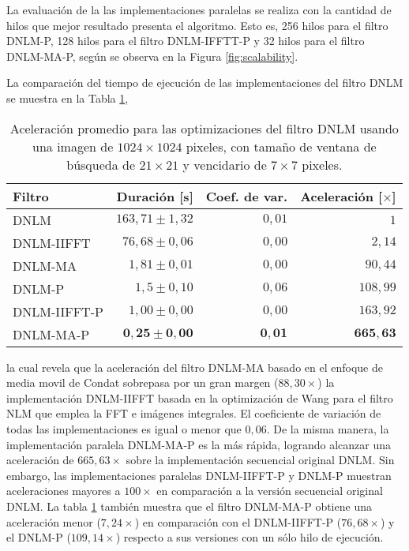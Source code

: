 La evaluaci\'on de la las implementaciones paralelas se realiza con la cantidad de hilos que mejor resultado presenta el algoritmo. Esto es, 256 hilos para el filtro DNLM-P, 128 hilos para el filtro DNLM-IFFTT-P y 32 hilos para el filtro DNLM-MA-P, según se observa en la Figura \ref{fig:scalability}. 


La comparación del tiempo de ejecución de las implementaciones del filtro DNLM se muestra en la Tabla \ref{tabla:speedup},
%
\begin{table}[htb]
\protect\caption[Aceleración promedio de optimizaciones del filtro DNLM]{Aceleración promedio para las optimizaciones del filtro DNLM usando una imagen de  $1024 \times 1024$ pixeles, con tama\~no de ventana de búsqueda de $21 \times 21$ y vencidario de $7 \times 7$ pixeles. \label{tabla:speedup}}
\centering
\begin{tabular}{lrrr}
Filtro & Duración [s]& Coef. de var. & Aceleración [$\times$]\tabularnewline
\hline
DNLM & $163,71\pm1,32$ & $0,01$ & $1$\tabularnewline
DNLM-IIFFT & $76,68\pm0,06$ & $0,00$ & $2,14$\tabularnewline
DNLM-MA & $1,81\pm 0,01$ & $0,00$ & $90,44$ \tabularnewline
DNLM-P & $1,5\pm0,10$ & $0,06$ & $108,99$\tabularnewline
DNLM-IIFFT-P & $1,00\pm0,00$ & $0,00$ & $163,92$ \tabularnewline 
DNLM-MA-P & $\boldsymbol{0,25\pm0,00}$ & $\boldsymbol{0,01}$ &  $\boldsymbol{665,63}$\tabularnewline
\end{tabular}
\end{table}
%
la cual revela que la aceleración del filtro DNLM-MA basado en el enfoque de media movil de Condat \cite{Condat2010} sobrepasa por un gran margen ($88,30\times$) la implementación DNLM-IIFFT \cite{CalderonRamirez2017} basada en la optimización de Wang para el filtro NLM \cite{wang2006fast} que emplea la FFT e imágenes integrales. El coeficiente de variación de todas las implementaciones es igual o menor que $0,06$. 
De la misma manera, la implementación paralela DNLM-MA-P es la más rápida, logrando alcanzar una aceleración de $665,63\times$ sobre la implementación secuencial original DNLM. Sin embargo, las implementaciones paralelas DNLM-IIFFT-P y DNLM-P muestran aceleraciones mayores a $100\times$ en comparación a la versión secuencial original DNLM.
La tabla \ref{tabla:speedup} también muestra que el filtro DNLM-MA-P obtiene una aceleración menor ($7,24\times$) en comparación con el DNLM-IIFFT-P ($76,68\times$) y el DNLM-P ($109,14\times$) respecto a sus versiones con un sólo hilo de ejecución.


